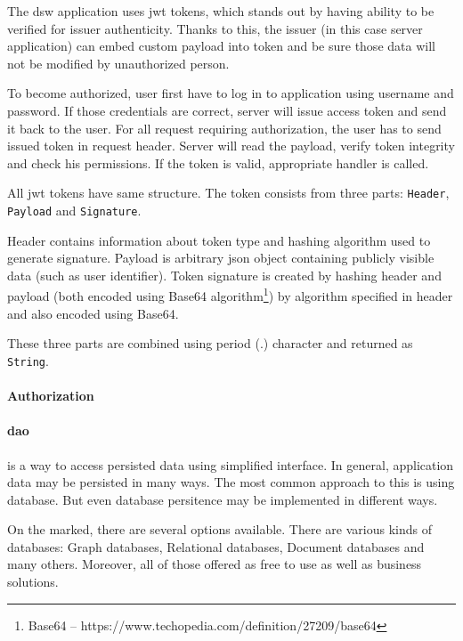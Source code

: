 The \gls{dsw} application uses \gls{jwt} tokens, which stands out by having ability to be verified for issuer authenticity.
Thanks to this, the issuer (in this case server application) can embed custom payload into token and be sure those data will not be modified by unauthorized person.

To become authorized, user first have to log in to application using username and password.
If those credentials are correct, server will issue access token and send it back to the user.
For all request requiring authorization, the user has to send issued token in request header.
Server will read the payload, verify token integrity and check his permissions.
If the token is valid, appropriate handler is called.

All \gls{jwt} tokens have same structure.
The token consists from three parts: \texttt{Header}, \texttt{Payload} and \texttt{Signature}.


Header contains information about token type and hashing algorithm used to generate signature.
Payload is arbitrary \gls{json} object containing publicly visible data (such as user identifier).
Token signature is created by hashing header and payload (both encoded using Base64 algorithm\footnote{Base64 -- https://www.techopedia.com/definition/27209/base64}) by algorithm specified in header and also encoded using Base64.

These three parts are combined using period (.) character and returned as \texttt{String}.

\paragraph*{Authorization}

\paragraph*{\gls{dao}} is a way to access persisted data using simplified interface.
In general, application data may be persisted in many ways.
The most common approach to this is using database. 
But even database persitence may be implemented in different ways.

On the marked, there are several options available.
There are various kinds of databases: Graph databases, Relational databases, Document databases and many others.
Moreover, all of those offered as free to use as well as business solutions.

